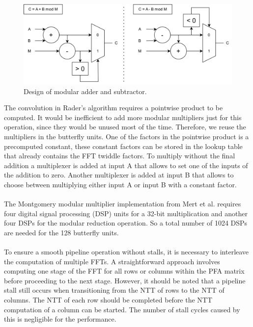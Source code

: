 \documentclass[english,master=eelt,masteroption=ec]{kulemt}
\begin{document}
\begin{figure}[h]
\centering
\includegraphics[width=1\textwidth]{img/mod_add_sub.png}
\caption{Design of modular adder and subtractor.}
\label{fig:mod_add_sub}
\end{figure}

\FloatBarrier

The convolution in Rader's algorithm requires a pointwise product to be computed. It would be inefficient to add more modular multipliers just for this operation, since they would be unused most of the time. Therefore, we reuse the multipliers in the butterfly units. One of the factors in the pointwise product is a precomputed constant, these constant factors can be stored in the lookup table that already contains the FFT twiddle factors. To multiply without the final addition a multiplexer is added at input A that allows to set one of the inputs of the addition to zero. Another multiplexer is added at input B that allows to choose between multiplying either input A or input B with a constant factor.
\\\\
The Montgomery modular multiplier implementation from Mert et al. requires four digital signal processing (DSP) units for a 32-bit multiplication and another four DSPs for the modular reduction operation. So a total number of 1024 DSPs are needed for the 128 butterfly units.
\\\\
To ensure a smooth pipeline operation without stalls, it is necessary to interleave the computation of multiple FFTs. A straightforward approach involves computing one stage of the FFT for all rows or columns within the PFA matrix before proceeding to the next stage. However, it should be noted that a pipeline stall still occurs when transitioning from the NTT of rows to the NTT of columns. The NTT of each row should be completed before the NTT computation of a column can be started. The number of stall cycles caused by this is negligible for the performance.
\end{document}
